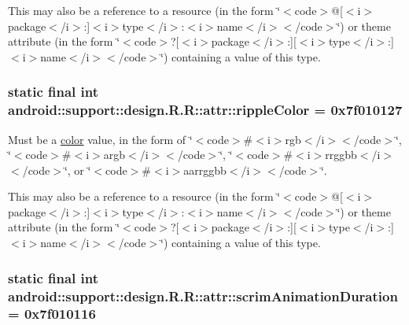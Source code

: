 This may also be a reference to a resource (in the form \char`\"{}$<$code$>$@\mbox{[}$<$i$>$package$<$/i$>$:\mbox{]}$<$i$>$type$<$/i$>$:$<$i$>$name$<$/i$>$$<$/code$>$\char`\"{}) or theme attribute (in the form \char`\"{}$<$code$>$?\mbox{[}$<$i$>$package$<$/i$>$:\mbox{]}\mbox{[}$<$i$>$type$<$/i$>$:\mbox{]}$<$i$>$name$<$/i$>$$<$/code$>$\char`\"{}) containing a value of this type. \hypertarget{classandroid_1_1support_1_1design_1_1_r_1_1attr_f09d0d95bc12d1d6788f7e701afbc74f}{
\subsubsection[{rippleColor}]{\setlength{\rightskip}{0pt plus 5cm}static final int android::support::design.R.R::attr::rippleColor = 0x7f010127}}
\label{classandroid_1_1support_1_1design_1_1_r_1_1attr_f09d0d95bc12d1d6788f7e701afbc74f}


Must be a \hyperlink{classandroid_1_1support_1_1design_1_1_r_1_1color}{color} value, in the form of \char`\"{}$<$code$>$\#$<$i$>$rgb$<$/i$>$$<$/code$>$\char`\"{}, \char`\"{}$<$code$>$\#$<$i$>$argb$<$/i$>$$<$/code$>$\char`\"{}, \char`\"{}$<$code$>$\#$<$i$>$rrggbb$<$/i$>$$<$/code$>$\char`\"{}, or \char`\"{}$<$code$>$\#$<$i$>$aarrggbb$<$/i$>$$<$/code$>$\char`\"{}. 

This may also be a reference to a resource (in the form \char`\"{}$<$code$>$@\mbox{[}$<$i$>$package$<$/i$>$:\mbox{]}$<$i$>$type$<$/i$>$:$<$i$>$name$<$/i$>$$<$/code$>$\char`\"{}) or theme attribute (in the form \char`\"{}$<$code$>$?\mbox{[}$<$i$>$package$<$/i$>$:\mbox{]}\mbox{[}$<$i$>$type$<$/i$>$:\mbox{]}$<$i$>$name$<$/i$>$$<$/code$>$\char`\"{}) containing a value of this type. \hypertarget{classandroid_1_1support_1_1design_1_1_r_1_1attr_08fd1effa8d2c7e829cb908f15c8c7d7}{
\subsubsection[{scrimAnimationDuration}]{\setlength{\rightskip}{0pt plus 5cm}static final int android::support::design.R.R::attr::scrimAnimationDuration = 0x7f010116}}
\label{classandroid_1_1support_1_1design_1_1_r_1_1attr_08fd1effa8d2c7e829cb908f15c8c7d7}


